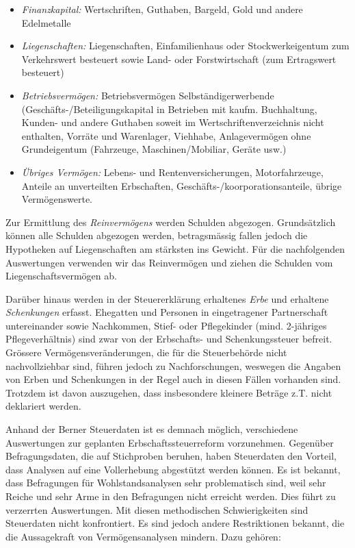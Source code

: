 \documentclass[a4paper, 12pt,liststotoc]{scrartcl}
\numberwithin{equation}{section}
\begin{document}
\begin{itemize}
\item
  \emph{Finanzkapital:} Wertschriften, Guthaben, Bargeld, Gold und
  andere Edelmetalle
\item
  \emph{Liegenschaften:} Liegenschaften, Einfamilienhaus oder
  Stockwerkeigentum zum Verkehrswert besteuert sowie Land- oder
  Forstwirtschaft (zum Ertragswert besteuert)
\item
  \emph{Betriebsvermögen:} Betriebsvermögen Selbständigerwerbende
  (Geschäfts-/Be\-tei\-li\-gungs\-ka\-pi\-tal in Betrieben mit kaufm. Buchhaltung,
  Kunden- und andere Guthaben soweit im Wertschriftenverzeichnis nicht
  enthalten, Vorräte und Warenlager, Viehhabe, Anlagevermögen ohne
  Grundeigentum (Fahrzeuge, Maschinen/Mobiliar, Geräte usw.)
\item
  \emph{Übriges Vermögen:} Lebens- und Rentenversicherungen,
  Motorfahrzeuge, Anteile an unverteilten Erbschaften,
  Geschäfts-/koorporationsanteile, übrige Vermögenswerte.
\end{itemize}

Zur Ermittlung des \emph{Reinvermögens} werden Schulden abgezogen.
Grundsätzlich können alle Schulden abgezogen werden, betragsmässig
fallen jedoch die Hypotheken auf Liegenschaften am stärksten ins
Gewicht. Für die nachfolgenden Auswertungen verwenden wir das
Reinvermögen und ziehen die Schulden vom Liegenschaftsvermögen ab.

Darüber hinaus werden in der Steuererklärung erhaltenes \emph{Erbe} und
erhaltene \emph{Schenkungen} erfasst. Ehegatten und Personen in eingetragener
Partnerschaft untereinander sowie Nachkommen, Stief- oder Pflegekinder
(mind. 2-jähriges Pflegeverhältnis) sind zwar von der Erbschafts- und
Schenkungssteuer befreit. Grössere Vermögensveränderungen, die für die
Steuerbehörde nicht nachvollziehbar sind, führen jedoch zu
Nachforschungen, weswegen die Angaben von Erben und Schenkungen in der
Regel auch in diesen Fällen vorhanden sind. Trotzdem ist davon
auszugehen, dass insbesondere kleinere Beträge z.T. nicht deklariert werden.

Anhand der Berner Steuerdaten ist es demnach möglich, verschiedene
Auswertungen zur geplanten Erbschaftssteuerreform vorzunehmen. Gegenüber
Befragungsdaten, die auf Stichproben beruhen, haben Steuerdaten den
Vorteil, dass Analysen auf eine Vollerhebung abgestützt werden können.
Es ist bekannt, dass Befragungen für Wohlstandsanalysen sehr
problematisch sind, weil sehr Reiche und sehr Arme in den Befragungen
nicht erreicht werden. Dies führt zu verzerrten Auswertungen. Mit diesen
methodischen Schwierigkeiten sind Steuerdaten nicht konfrontiert. Es
sind jedoch andere Restriktionen bekannt, die die Aussagekraft von
Vermögensanalysen mindern. Dazu gehören:
\end{document}
